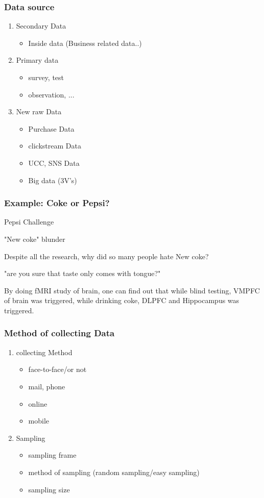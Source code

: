 \documentclass[12pt]{article}
\begin{document}
\subsubsection{Data source}
\begin{enumerate}
	\item Secondary Data
	\begin{itemize}
		\item Inside data (Business related data..)
	\end{itemize}
	\item Primary data
	\begin{itemize}
		\item survey, test
		\item observation, ...
	\end{itemize}
	\item New raw Data
	\begin{itemize}
		\item Purchase Data
		\item clickstream Data
		\item UCC, SNS Data
		\item Big data (3V's)
	\end{itemize}
\end{enumerate}

\subsubsection{Example: Coke or Pepsi?}

Pepsi Challenge

"New coke" blunder

Despite all the research, why did so many people hate New coke?

"are you sure that taste only comes with tongue?"

By doing fMRI study of brain, one can find out that while blind testing, VMPFC of brain was triggered, while drinking coke, DLPFC and Hippocampus was triggered.

\subsubsection{Method of collecting Data}

\begin{enumerate}
	\item collecting Method
	\begin{itemize}
		\item face-to-face/or not
		\item mail, phone
		\item online
		\item mobile
	\end{itemize}
	\item Sampling
	\begin{itemize}
		\item sampling frame
		\item method of sampling (random sampling/easy sampling)
		\item sampling size
	\end{itemize}
\end{enumerate}
\end{document}
